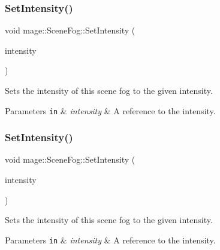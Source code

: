 \subsubsection{\texorpdfstring{Set\+Intensity()}{SetIntensity()}\hspace{0.1cm}{\footnotesize\ttfamily [1/2]}}
{\footnotesize\ttfamily void mage\+::\+Scene\+Fog\+::\+Set\+Intensity (\begin{DoxyParamCaption}\item[{const \hyperlink{structmage_1_1_r_g_b_spectrum}{R\+G\+B\+Spectrum} \&}]{intensity }\end{DoxyParamCaption})\hspace{0.3cm}{\ttfamily [noexcept]}}

Sets the intensity of this scene fog to the given intensity.


\begin{DoxyParams}[1]{Parameters}
\mbox{\tt in}  & {\em intensity} & A reference to the intensity. \\
\hline
\end{DoxyParams}
\hypertarget{structmage_1_1_scene_fog_aa953b6e08e2f6bcecfbb906959e876ea}{}\label{structmage_1_1_scene_fog_aa953b6e08e2f6bcecfbb906959e876ea} 
\subsubsection{\texorpdfstring{Set\+Intensity()}{SetIntensity()}\hspace{0.1cm}{\footnotesize\ttfamily [2/2]}}
{\footnotesize\ttfamily void mage\+::\+Scene\+Fog\+::\+Set\+Intensity (\begin{DoxyParamCaption}\item[{\hyperlink{structmage_1_1_r_g_b_spectrum}{R\+G\+B\+Spectrum} \&\&}]{intensity }\end{DoxyParamCaption})\hspace{0.3cm}{\ttfamily [noexcept]}}

Sets the intensity of this scene fog to the given intensity.


\begin{DoxyParams}[1]{Parameters}
\mbox{\tt in}  & {\em intensity} & A reference to the intensity. \\
\hline
\end{DoxyParams}
\hypertarget{structmage_1_1_scene_fog_a8b576af97ac9502af5fd913c1aa18391}{}\label{structmage_1_1_scene_fog_a8b576af97ac9502af5fd913c1aa18391} 
